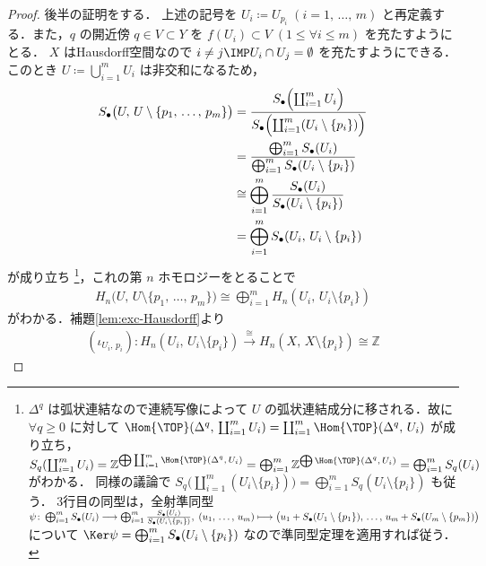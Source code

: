 \documentclass[algtopo_main]{subfiles}
\begin{document}
\begin{proof}
    後半の証明をする．
    上述の記号を $U_i \coloneqq U_{p_i}\; (i=1,\, \dots,\, m)$ と再定義する．また，$q$ の開近傍 $q \in V \subset Y$ を $f(U_i) \subset V\; (1 \le \forall i \le m)$ を充たすようにとる．
    $X$ はHausdorff空間なので $i \neq j\IMP U_{i} \cap U_{j} = \emptyset$ を充たすようにできる．
    このとき $U \coloneqq \bigcup_{i=1}^m U_i$ は非交和になるため，
    \begin{align}
        S_\bullet \bigl( U,\, U \setminus \{p_1,\, \dots ,\, p_m\} \bigr) &= \frac{S_\bullet \Bigl( \coprod_{i=1}^m U_i \Bigr) }{S_\bullet \Bigl( \coprod_{i=1}^m (U_i \setminus \{p_i\}) \Bigr) } \\
        &= \frac{\bigoplus_{i=1}^m S_\bullet (U_i)}{\bigoplus_{i=1}^m S_\bullet (U_i \setminus \{p_i\})} \\
        &\cong \bigoplus_{i=1}^m \frac{S_\bullet (U_i)}{S_\bullet (U_i \setminus \{p_i\})} \\ 
        &= \bigoplus_{i=1}^m S_\bullet (U_i,\, U_i \setminus \{p_i\})
    \end{align}
    が成り立ち
    \footnote{
        $\Delta^q$ は弧状連結なので連続写像によって $U$ の弧状連結成分に移される．故に $\forall q \ge 0$ に対して $\Hom{\TOP}(\Delta^q,\, \coprod_{i=1}^m U_i) = \coprod_{i=1}^m \Hom{\TOP} (\Delta^q,\, U_i)$ が成り立ち，$S_q (\coprod_{i=1}^m U_i) = \mathbb{Z}^{\bigoplus \coprod_{i=1}^m \Hom{\TOP} (\Delta^q,\, U_i)} = \bigoplus_{i=1}^m \mathbb{Z}^{\bigoplus \Hom{\TOP} (\Delta^q,\, U_i)} = \bigoplus_{i=1}^m S_q(U_i)$ がわかる．
        同様の議論で $S_q \bigl( \coprod_{i=1}^m (U_i \setminus \{p_i\}) \bigr) = \bigoplus_{i=1}^m S_q(U_i \setminus \{p_i\})$ も従う．
        3行目の同型は，全射準同型 $\psi \colon \bigoplus_{i=1}^m S_\bullet (U_i) \longrightarrow \bigoplus_{i=1}^m \frac{S_\bullet (U_i)}{S_\bullet (U_i \setminus \{p_i\})},\; (u_1,\, \dots ,\, u_m) \longmapsto \bigl( u_1 + S_\bullet (U_1 \setminus \{p_1\}),\, \dots,\, u_m + S_\bullet (U_m \setminus \{p_m\}) \bigr)$ について $\Ker \psi = \bigoplus_{i=1}^m S_\bullet (U_i \setminus \{p_i\})$ なので準同型定理を適用すれば従う． 
    }，これの第 $n$ ホモロジーをとることで
    \begin{align}
        H_n \bigl( U,\, U \setminus  \{p_1,\, \dots ,\, p_m\} \bigr) \cong \bigoplus_{i=1}^m H_n (U_i,\, U_i \setminus \{p_i\})
    \end{align}
    がわかる．補題\ref{lem:exc-Hausdorff}より
    \begin{align}
        \label{cmtd:loc-deg-1}
        (\iota_{U_i,\, p_i}) \colon H_n (U_i,\, U_i \setminus \{p_i\}) \xrightarrow{\cong} H_n (X,\, X \setminus \{p_i\}) \cong \mathbb{Z}

\end{align}
\end{proof}
\end{document}
